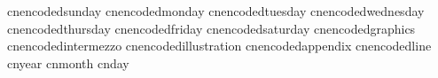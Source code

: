    cnencodedsunday           {}
   cnencodedmonday           {}
   cnencodedtuesday          {}
   cnencodedwednesday        {}
   cnencodedthursday         {}
   cnencodedfriday           {}
   cnencodedsaturday         {}
   cnencodedgraphics	   {}
   cnencodedintermezzo	   {}
   cnencodedillustration	   {}
   cnencodedappendix	   {}
   cnencodedline		   {}
   cnyear                    {}
   cnmonth                   {}
   cnday                     {}
\stopencoding

